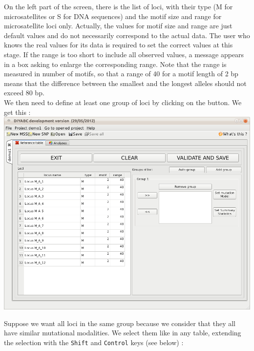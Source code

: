 On the left part of the screen, there is the list of loci, with their type (M for microsatellites or S for DNA sequences) and the motif size and range for microsatellite loci only. Actually, the values for motif size and range are just default values and do not necessarily correspond to the actual data. The user who knows the real values for its data is required to set the correct values at this stage. If the range is too short to include all observed values, a message appears in a box asking to enlarge the corresponding range. Note that the range is measured in number of motifs, so that a range of 40 for a motif length of 2 bp means that the difference between the smallest and the longest alleles should not exceed 80 bp.\\
We then need to define at least one group of loci by clicking on the  button. We get this :\\

\includegraphics[scale=0.35]{gui_pictures/Capture-DIYABC-16.png} 

Suppose we want all loci in the same group because we consider that they all have similar mutational modalities. We select them like in any table, extending the selection with the \texttt{Shift} and \texttt{Control} keys (see below) : \\

